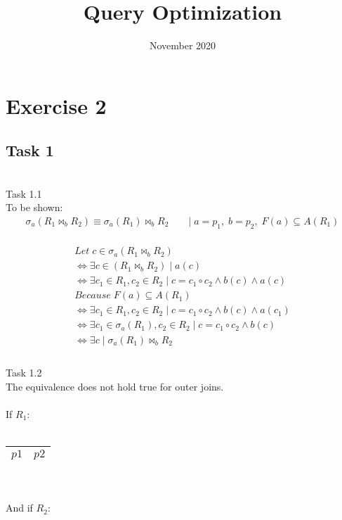 \documentclass[10pt,a4paper]{article}
\title{Query Optimization}
\date{November 2020}
\begin{document}
\maketitle

\section{Exercise 2}
\subsection{Task 1}
~\\
Task 1.1
~\\
To be shown:
\begin{equation}
\nonumber
\begin{aligned}
\sigma_a (R_1\Join_b R_2) \equiv \sigma_a(R_1) \Join_b R_2 \qquad|\;a=p_1,\;b=p_2,\;F(a)\subseteq A(R_1)
\end{aligned}
\end{equation}
~\\
\begin{equation}
\nonumber
\begin{aligned}
Let\; c\in \sigma_a (R_1\Join_b R_2)\\
\iff \exists c\in(R_1\Join_b R_2)\; |\; a(c)\\
\iff \exists c_1\in R_1,c_2\in R_2\; |\; c=c_1\circ c_2\wedge b(c)\wedge a(c)\\
Because\; F(a)\subseteq A(R_1)\\
\iff \exists c_1\in R_1,c_2\in R_2\; |\; c=c_1\circ c_2\wedge b(c)\wedge a(c_1)\\
\iff \exists c_1\in \sigma_a (R_1),c_2\in R_2\; |\; c=c_1\circ c_2\wedge b(c)\\
\iff \exists c \;|\; \sigma_a(R_1) \Join_b R_2\\
\end{aligned}
\end{equation}
~\\
Task 1.2
~\\
The equivalence does not hold true for outer joins.\\
~\\
If $R_1$:\\~\\
\begin{tabular}{| c |c |}
\hline
 $p1$ &$p2$ \\ 
 \hline
\end{tabular}
~\\
~\\
And if $R_2$:\\~\\
\end{document}
